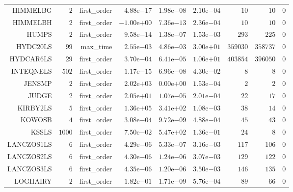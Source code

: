 \begin{longtable}{rrrrrrrrr}
HIMMELBG & \(     2\) & first\_order & \( 4.88\)e\(-17\) & \( 1.98\)e\(-08\) & \( 2.10\)e\(-04\) & \(    10\) & \(    10\) & \(     0\) \\
HIMMELBH & \(     2\) & first\_order & \(-1.00\)e\(+00\) & \( 7.36\)e\(-13\) & \( 2.36\)e\(-04\) & \(    10\) & \(    10\) & \(     0\) \\
HUMPS & \(     2\) & first\_order & \( 9.58\)e\(-14\) & \( 1.38\)e\(-07\) & \( 1.53\)e\(-03\) & \(   293\) & \(   225\) & \(     0\) \\
HYDC20LS & \(    99\) & max\_time & \( 2.55\)e\(-03\) & \( 4.86\)e\(-03\) & \( 3.00\)e\(+01\) & \(359030\) & \(358737\) & \(     0\) \\
HYDCAR6LS & \(    29\) & first\_order & \( 3.70\)e\(-04\) & \( 6.41\)e\(-05\) & \( 1.06\)e\(+01\) & \(403854\) & \(396050\) & \(     0\) \\
INTEQNELS & \(   502\) & first\_order & \( 1.17\)e\(-15\) & \( 6.96\)e\(-08\) & \( 4.30\)e\(-02\) & \(     8\) & \(     8\) & \(     0\) \\
JENSMP & \(     2\) & first\_order & \( 2.02\)e\(+03\) & \( 0.00\)e\(+00\) & \( 1.53\)e\(-04\) & \(     2\) & \(     2\) & \(     0\) \\
JUDGE & \(     2\) & first\_order & \( 2.05\)e\(+01\) & \( 1.07\)e\(-05\) & \( 2.01\)e\(-04\) & \(    22\) & \(    17\) & \(     0\) \\
KIRBY2LS & \(     5\) & first\_order & \( 1.36\)e\(+05\) & \( 3.41\)e\(+02\) & \( 1.08\)e\(-03\) & \(    38\) & \(    14\) & \(     0\) \\
KOWOSB & \(     4\) & first\_order & \( 3.08\)e\(-04\) & \( 9.72\)e\(-09\) & \( 4.88\)e\(-04\) & \(    45\) & \(    43\) & \(     0\) \\
KSSLS & \(  1000\) & first\_order & \( 7.50\)e\(-02\) & \( 5.47\)e\(+02\) & \( 1.36\)e\(-01\) & \(    24\) & \(     8\) & \(     0\) \\
LANCZOS1LS & \(     6\) & first\_order & \( 4.29\)e\(-06\) & \( 5.33\)e\(-07\) & \( 3.16\)e\(-03\) & \(   117\) & \(   106\) & \(     0\) \\
LANCZOS2LS & \(     6\) & first\_order & \( 4.30\)e\(-06\) & \( 1.24\)e\(-06\) & \( 3.07\)e\(-03\) & \(   129\) & \(   122\) & \(     0\) \\
LANCZOS3LS & \(     6\) & first\_order & \( 4.35\)e\(-06\) & \( 1.20\)e\(-06\) & \( 3.50\)e\(-03\) & \(   146\) & \(   135\) & \(     0\) \\
LOGHAIRY & \(     2\) & first\_order & \( 1.82\)e\(-01\) & \( 1.71\)e\(-09\) & \( 5.76\)e\(-04\) & \(    89\) & \(    66\) & \(     0\) \\

\end{longtable}
